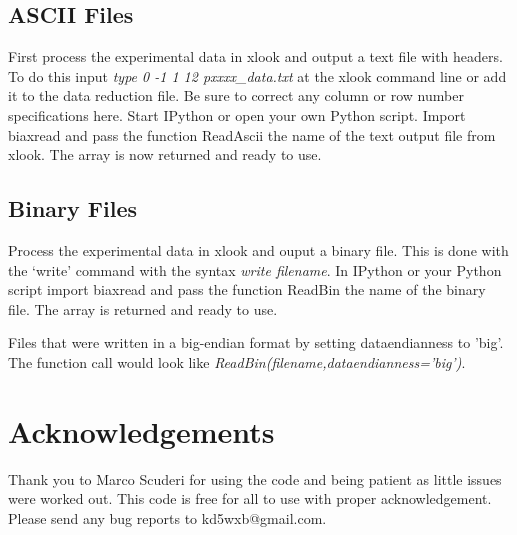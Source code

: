 \documentclass[a4paper,11pt,oneside]{article}
\begin{document}
\subsection{ASCII Files}
First process the experimental data in xlook and output a text file with headers.  To do this input \emph{type 0 -1 1 12 pxxxx\_data.txt} at the xlook command line or add it to the data reduction file.  Be sure to correct any column or row number specifications here.  Start IPython or open your own Python script.  Import biaxread and pass the function ReadAscii the name of the text output file from xlook.  The array is now returned and ready to use.  


\subsection{Binary Files}
Process the experimental data in xlook and ouput a binary file.  This is done with the `write' command with the syntax \emph{write filename}.  In IPython or your Python script import biaxread and pass the function ReadBin the name of the binary file.  The array is returned and ready to use.

Files that were written in a big-endian format by setting dataendianness to 'big'.  The function call would look like \emph{ReadBin(filename,dataendianness='big')}.

\section{Acknowledgements}
Thank you to Marco Scuderi for using the code and being patient as little issues were worked out.  This code is free for all to use with proper acknowledgement.  Please send any bug reports to kd5wxb@gmail.com.


\newpage
\end{document}
